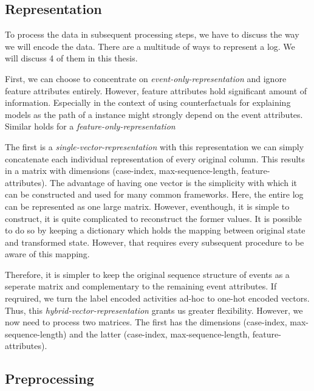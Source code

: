 \documentclass[./../../paper.tex]{subfiles}
\begin{document}
\subsection{Representation}
\label{sec:representation}
To process the data in subsequent processing steps, we have to discuss the way we will encode the data. There are a multitude of ways to represent a log. We will discuss 4 of them in this thesis. 

First, we can choose to concentrate on \emph{event-only-representation} and ignore feature attributes entirely. However, feature attributes hold significant amount of information. Especially in the context of using counterfactuals for explaining models as the path of a \gls{instance} might strongly depend on the event attributes. Similar holds for a \emph{feature-only-representation} 

The first is a \emph{single-vector-representation} with this representation we can simply concatenate each individual representation of every original column. This results in a matrix with dimensions (case-index, max-sequence-length, feature-attributes). The advantage of having one vector is the simplicity with which it can be constructed and used for many common frameworks. Here, the entire log can be represented as one large matrix. However, eventhough, it is simple to construct, it is quite complicated to reconstruct the former values. It is possible to do so by keeping a dictionary which holds the mapping between original state and transformed state. However, that requires every subsequent procedure to be aware of this mapping. 

Therefore, it is simpler to keep the original sequence structure of events as a seperate matrix and complementary to the remaining event attributes. If reqruired, we turn the label encoded activities ad-hoc to one-hot encoded vectors. Thus, this \emph{hybrid-vector-representation} grants us greater flexibility. However, we now need to process two matrices. The first has the dimensions (case-index, max-sequence-length) and the latter (case-index, max-sequence-length, feature-attributes). 

\subsection{Preprocessing}
\label{sec:preprocessing}
\end{document}
